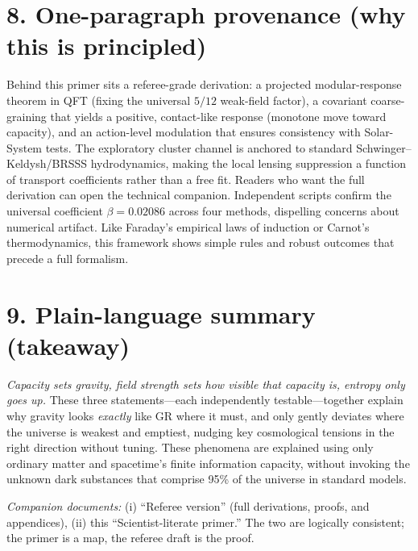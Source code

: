\documentclass[aps,prd,onecolumn,superscriptaddress,nofootinbib]{revtex4-2}
\begin{document}
\section*{8. One-paragraph provenance (why this is principled)}
Behind this primer sits a referee-grade derivation: a projected modular-response theorem in QFT (fixing the universal $5/12$ weak-field factor), a covariant coarse-graining that yields a positive, contact-like response (monotone move toward capacity), and an action-level modulation that ensures consistency with Solar-System tests. The exploratory cluster channel is anchored to standard Schwinger--Keldysh/BRSSS hydrodynamics, making the local lensing suppression a function of transport coefficients rather than a free fit. Readers who want the full derivation can open the technical companion. Independent scripts confirm the universal coefficient $\beta = 0.02086$ across four methods, dispelling concerns about numerical artifact. Like Faraday's empirical laws of induction or Carnot's thermodynamics, this framework shows simple rules and robust outcomes that precede a full formalism.

\section*{9. Plain-language summary (takeaway)}
\emph{Capacity sets gravity, field strength sets how visible that capacity is, entropy only goes up.} These three statements---each independently testable---together explain why gravity looks \emph{exactly} like GR where it must, and only gently deviates where the universe is weakest and emptiest, nudging key cosmological tensions in the right direction without tuning. These phenomena are explained using only ordinary matter and spacetime's finite information capacity, without invoking the unknown dark substances that comprise 95\% of the universe in standard models.

\bigskip
\noindent\textit{Companion documents:} (i) ``Referee version'' (full derivations, proofs, and appendices), (ii) this ``Scientist-literate primer.'' The two are logically consistent; the primer is a map, the referee draft is the proof.
\end{document}
